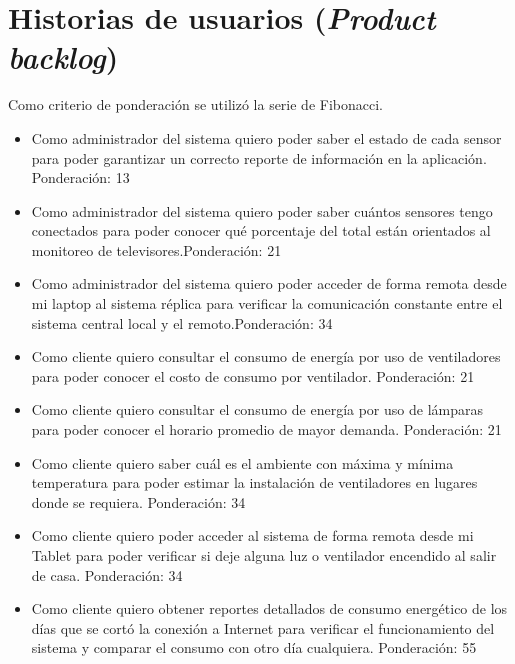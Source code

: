 \documentclass[11pt]{charter}
\begin{document}
\section{Historias de usuarios (\textit{Product backlog})}
\label{sec:backlog}
Como criterio de ponderación se utilizó la serie de Fibonacci.
\begin{itemize}
\item Como administrador del sistema quiero poder saber el estado de cada sensor para poder garantizar un correcto reporte de información en la aplicación.\newline
Ponderación: 13
\item Como administrador del sistema quiero poder saber cuántos sensores tengo conectados para poder conocer qué porcentaje del total están orientados al monitoreo de televisores.\newline Ponderación: 21
\item Como administrador del sistema quiero poder acceder de forma remota desde mi laptop al sistema réplica para verificar la comunicación constante entre el sistema central local y el remoto.\newline Ponderación: 34
\item Como cliente quiero consultar el consumo de energía por uso de ventiladores para poder conocer el costo de consumo por ventilador. \newline Ponderación: 21
\item Como cliente quiero consultar el consumo de energía por uso de lámparas para poder conocer el horario promedio de mayor demanda. \newline Ponderación: 21
\item Como cliente quiero saber cuál es el ambiente con máxima y mínima temperatura para poder estimar la instalación de ventiladores en lugares donde se requiera. \newline Ponderación: 34
\item Como cliente quiero poder acceder al sistema de forma remota desde mi Tablet para poder verificar si deje alguna luz o ventilador encendido al salir de casa. \newline Ponderación: 34
\item Como cliente quiero obtener reportes detallados de consumo energético de los días que se cortó la conexión a Internet para verificar el funcionamiento del sistema y comparar el consumo con otro día cualquiera. \newline Ponderación: 55
\end{itemize}
\end{document}
